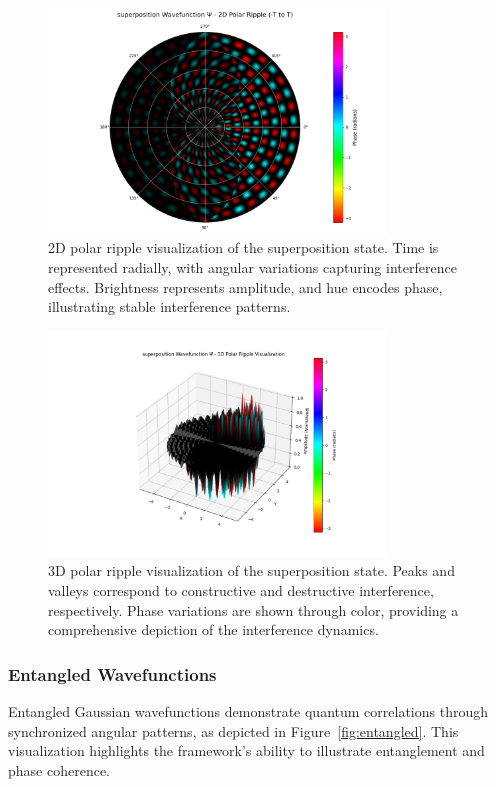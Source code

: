 \documentclass[12pt]{article}
\begin{document}
\begin{figure}[H]
\centering
\includegraphics[width=0.8\textwidth]{images/superposition_wavefunction_2d_polar_probability_density_with_phase.png}
\caption{2D polar ripple visualization of the superposition state. Time is represented radially, with angular variations capturing interference effects. Brightness represents amplitude, and hue encodes phase, illustrating stable interference patterns.}
\label{fig:superposition_2d_polar}
\end{figure}

\begin{figure}[H]
\centering
\includegraphics[width=0.8\textwidth]{images/superposition_wavefunction_3d_polar_probability_density_with_phase.png}
\caption{3D polar ripple visualization of the superposition state. Peaks and valleys correspond to constructive and destructive interference, respectively. Phase variations are shown through color, providing a comprehensive depiction of the interference dynamics.}
\label{fig:superposition_3d}
\end{figure}

\subsubsection{Entangled Wavefunctions}
Entangled Gaussian wavefunctions demonstrate quantum correlations through synchronized angular patterns, as depicted in Figure~\ref{fig:entangled}. This visualization highlights the framework's ability to illustrate entanglement and phase coherence.
\end{document}
